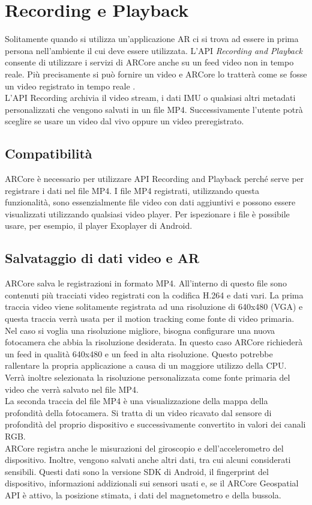 \documentclass[crop=false, class=book]{standalone}
\begin{document}
	\chapter{Recording e Playback}
	
	Solitamente quando si utilizza un’applicazione AR ci si trova ad essere in prima persona nell’ambiente il cui deve essere utilizzata.	L'API \textit{Recording and Playback} consente di utilizzare i servizi di ARCore anche su un feed video non in tempo reale. Più precisamente si può fornire un video e ARCore lo tratterà come se fosse un video registrato in tempo reale \cite{google2022rec}.
	\\
	\noindent
	L'API Recording archivia il video stream, i dati IMU o qualsiasi altri metadati personalizzati che vengono salvati in un file MP4. Successivamente l’utente potrà sceglire se usare un video dal vivo oppure un video preregistrato.
 
	\section{Compatibilità}
	ARCore è necessario per utilizzare API Recording and Playback perché serve per registrare i dati nel file MP4. I file MP4 registrati, utilizzando questa funzionalità, sono essenzialmente file video con dati aggiuntivi e possono essere visualizzati utilizzando qualsiasi video player. Per ispezionare i file è possibile usare, per esempio, il player Exoplayer di Android.
	 
	\section{Salvataggio di dati video e AR}
	ARCore salva le registrazioni in formato MP4. All’interno di questo file sono contenuti più tracciati video registrati con la codifica H.264 e dati vari. La prima traccia video viene solitamente registrata ad una risoluzione di 640x480 (VGA) e questa traccia verrà usata per il motion tracking come fonte di video primaria.
	\\
	\noindent
	Nel caso si voglia una risoluzione migliore, bisogna configurare una nuova fotocamera che abbia la risoluzione desiderata.
	In questo caso ARCore richiederà un feed in qualità 640x480 e un feed in alta risoluzione. Questo potrebbe rallentare la propria applicazione a causa di un maggiore utilizzo della CPU. Verrà inoltre selezionata la risoluzione personalizzata come fonte primaria del video che verrà salvato nel file MP4.
	\\
	\noindent
	La seconda traccia del file MP4 è una visualizzazione della mappa della profondità della fotocamera. Si tratta di un video ricavato dal sensore di profondità del proprio dispositivo e successivamente convertito in valori dei canali RGB.
	\\
	\noindent
	ARCore registra anche le misurazioni del giroscopio e dell’accelerometro del dispositivo. Inoltre, vengono salvati anche altri dati, tra cui alcuni considerati sensibili. Questi dati sono la versione SDK di Android, il fingerprint del dispositivo, informazioni addizionali sui sensori usati e, se il ARCore Geospatial API è attivo, la posizione stimata, i dati del magnetometro e della bussola.
	 
\end{document}
